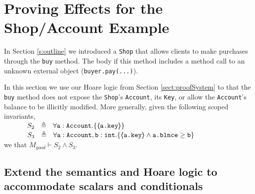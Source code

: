 \section{  {Proving \Tamed Effects for the Shop/Account Example}}

\label{s:app:example}

In Section \ref{s:outline} we introduced a \verb|Shop| that allows clients to make purchases through the
\verb|buy| method.
The body if this method  includes a method call to an unknown external object (\verb|buyer.pay(...)|).

In this section  we use our Hoare logic from Section \ref{sect:proofSystem} to  that the \verb|buy| method
does not expose the \verb|Shop|'s  \verb|Account|, its \verb|Key|, or allow the \verb|Account|'s balance to be illicitly modified. 
More generally,   given  the following scoped invariants, \\  
$\strut  \SPSP  S_2\ \  \triangleq \ \ \TwoStatesN  {\prg{a}:\prg{Account}}  {\inside{\prg{a.key}}} $ 
 \\
$\strut  \SPSP  S_3\ \  \triangleq \ \ \TwoStatesN{ \prg{a}:\prg{Account},\prg{b}:\prg{int} } {\inside{\prg{a.key}} \wedge \prg{a.\balance} \geq \prg{b} } $ 
\\
 we  that $M_{good} \vdash S_2 \wedge S_3$.


\subsection{Extend the semantics and Hoare logic to accommodate scalars and conditionals}
\label{s:app:scalars}


